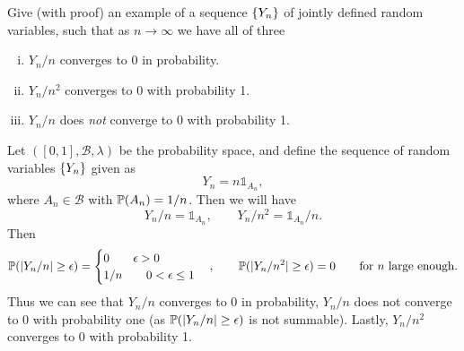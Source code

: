 \begin{problem}
	Give (with proof) an example of a sequence $ \{Y_n\} $ of jointly defined random variables, such that as $ n\to\infty $ we have all of three
	\begin{enumerate}[(i)]
		\item $ Y_n/n $ converges to $ 0 $ in probability.
		\item $ Y_n/n^2 $ converges to $ 0 $ with probability 1.
		\item $ Y_n/n $ does \emph{not} converge to 0 with probability 1.
	\end{enumerate}
\end{problem}
\begin{solution}
	Let $ ([0,1],\mathcal{B},\lambda) $ be the probability space, and define the sequence of random variables $ \{Y_n\} $ given as
	\[ Y_n = n\mathds{1}_{A_n}, \]
	where $ A_n \in \mathcal{B} $ with $ \mathbb{P}(A_n) = 1/n $. Then we will have
	\[ Y_n/n = \mathds{1}_{A_n},\qquad Y_n/n^2 = \mathds{1}_{A_n}/n. \]
	Then
	\[ \mathbb{P}(|Y_n/n|\geq \epsilon) = 
	\begin{cases}
		0 \qquad \epsilon > 0\\
		1/n \qquad 0<\epsilon\leq 1
	\end{cases}, \qquad
	\mathbb{P}(|Y_n/n^2|\geq \epsilon) = 0 \qquad \text{for $ n $ large enough.}
	 \]
	 Thus we can see that $ Y_n/n $ converges to 0 in probability, $ Y_n/n $ does not converge to 0 with probability one (as $ \mathbb{P}(|Y_n/n|\geq \epsilon) $ is not summable). Lastly, $ Y_n/n^2 $ converges to 0 with probability 1.
\end{solution}


